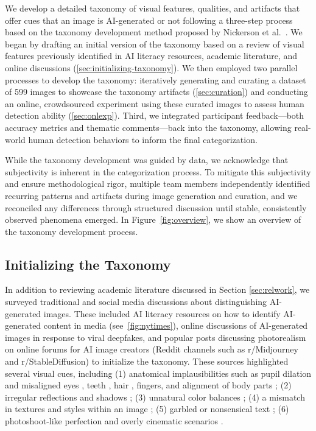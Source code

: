 We develop a detailed taxonomy of visual features, qualities, and artifacts that offer cues that an image is AI-generated or not following a three-step process based on the taxonomy development method proposed by Nickerson et al.~\cite{nickerson2013method}. We began by drafting an initial version of the taxonomy based on a review of visual features previously identified in AI literacy resources, academic literature, and online discussions (\autoref{sec:initializing-taxonomy}). We then employed two parallel processes to develop the taxonomy: iteratively generating and curating a dataset of 599 images to showcase the taxonomy artifacts (\autoref{sec:curation}) and conducting an online, crowdsourced experiment using these curated images to assess human detection ability (\autoref{sec:onlexp}). Third, we integrated participant feedback---both accuracy metrics and thematic comments---back into the taxonomy, allowing real-world human detection behaviors to inform the final categorization.

While the taxonomy development was guided by data, we acknowledge that subjectivity is inherent in the categorization process. To mitigate this subjectivity and ensure methodological rigor, multiple team members independently identified recurring patterns and artifacts during image generation and curation, and we reconciled any differences through structured discussion until stable, consistently observed phenomena emerged. In Figure~\ref{fig:overview}, we show an overview of the taxonomy development process.


\subsection{Initializing the Taxonomy} \label{sec:initializing-taxonomy}
In addition to reviewing academic literature discussed in Section \ref{sec:relwork}, we surveyed traditional and social media discussions about distinguishing AI-generated images. These included AI literacy resources on how to identify AI-generated content in media (see~\autoref{fig:nytimes}), online discussions of AI-generated images in response to viral deepfakes, and popular posts discussing photorealism on online forums for AI image creators (Reddit channels such as r/Midjourney and r/StableDiffusion) to initialize the taxonomy. These sources highlighted several visual cues, including (1) anatomical implausibilities such as pupil dilation and misaligned eyes \cite{norton2024deepfakes, techtarget2024deepfakes, nytimes2024deepfake}, teeth \cite{realitydefender2024deepfake}, hair  \cite{norton2024deepfakes, realitydefender2024deepfake}, fingers, and alignment of body parts  \cite{norton2024deepfakes, realitydefender2024deepfake, nytimes2024deepfake}; (2) irregular reflections and shadows \cite{realitydefender2024deepfake, eweek2024deepfake, techtarget2024deepfakes}; (3) unnatural color balances  \cite{norton2024deepfakes, realitydefender2024deepfake}; (4) a mismatch in textures and styles within an image  \cite{norton2024deepfakes, realitydefender2024deepfake, eweek2024deepfake}; (5) garbled or nonsensical text \cite{nytimes2024deepfake}; 
(6) photoshoot-like perfection and overly cinematic scenarios \cite{reddit2023}.

